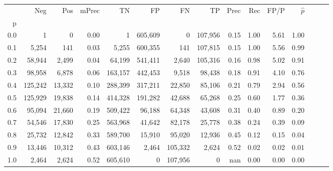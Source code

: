 \begin{tabular}{rrrrrrrrrrrrrrr}
\toprule
{} &      Neg &     Pos & mPrec &       TN &       FP &       FN &       TP &  Prec &   Rec &  FP/P & $\hat{p}$ \\
p   &          &         &       &          &          &          &          &       &       &       &           \\
\midrule
0.0 &        1 &       0 &  0.00 &        1 &  605,609 &        0 &  107,956 &  0.15 &  1.00 &  5.61 &      1.00 \\
0.1 &    5,254 &     141 &  0.03 &    5,255 &  600,355 &      141 &  107,815 &  0.15 &  1.00 &  5.56 &      0.99 \\
0.2 &   58,944 &   2,499 &  0.04 &   64,199 &  541,411 &    2,640 &  105,316 &  0.16 &  0.98 &  5.02 &      0.91 \\
0.3 &   98,958 &   6,878 &  0.06 &  163,157 &  442,453 &    9,518 &   98,438 &  0.18 &  0.91 &  4.10 &      0.76 \\
0.4 &  125,242 &  13,332 &  0.10 &  288,399 &  317,211 &   22,850 &   85,106 &  0.21 &  0.79 &  2.94 &      0.56 \\
0.5 &  125,929 &  19,838 &  0.14 &  414,328 &  191,282 &   42,688 &   65,268 &  0.25 &  0.60 &  1.77 &      0.36 \\
0.6 &   95,094 &  21,660 &  0.19 &  509,422 &   96,188 &   64,348 &   43,608 &  0.31 &  0.40 &  0.89 &      0.20 \\
0.7 &   54,546 &  17,830 &  0.25 &  563,968 &   41,642 &   82,178 &   25,778 &  0.38 &  0.24 &  0.39 &      0.09 \\
0.8 &   25,732 &  12,842 &  0.33 &  589,700 &   15,910 &   95,020 &   12,936 &  0.45 &  0.12 &  0.15 &      0.04 \\
0.9 &   13,446 &  10,312 &  0.43 &  603,146 &    2,464 &  105,332 &    2,624 &  0.52 &  0.02 &  0.02 &      0.01 \\
1.0 &    2,464 &   2,624 &  0.52 &  605,610 &        0 &  107,956 &        0 &   nan &  0.00 &  0.00 &      0.00 \\
\bottomrule
\end{tabular}
